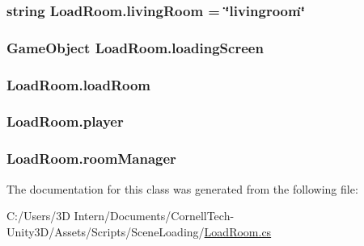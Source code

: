 \subsubsection[{\texorpdfstring{living\+Room}{livingRoom}}]{\setlength{\rightskip}{0pt plus 5cm}string Load\+Room.\+living\+Room = \char`\"{}livingroom\char`\"{}}\hypertarget{class_load_room_abcb915de7cd7a198c227c0fb6fd14abb}{}\label{class_load_room_abcb915de7cd7a198c227c0fb6fd14abb}
\subsubsection[{\texorpdfstring{loading\+Screen}{loadingScreen}}]{\setlength{\rightskip}{0pt plus 5cm}Game\+Object Load\+Room.\+loading\+Screen}\hypertarget{class_load_room_a308e03f01638759404f53480035a56ef}{}\label{class_load_room_a308e03f01638759404f53480035a56ef}
\subsubsection[{\texorpdfstring{load\+Room}{loadRoom}}]{ Load\+Room.\+load\+Room}\hypertarget{class_load_room_ac2bc4bbe4711024d88ea84aefa93360f}{}\label{class_load_room_ac2bc4bbe4711024d88ea84aefa93360f}
\subsubsection[{\texorpdfstring{player}{player}}]{ Load\+Room.\+player}\hypertarget{class_load_room_ad89f4048cd330067fe3bd7463db5a61a}{}\label{class_load_room_ad89f4048cd330067fe3bd7463db5a61a}
\subsubsection[{\texorpdfstring{room\+Manager}{roomManager}}]{ Load\+Room.\+room\+Manager}\hypertarget{class_load_room_a5c7958b95901648e910d75dbda560d52}{}\label{class_load_room_a5c7958b95901648e910d75dbda560d52}


The documentation for this class was generated from the following file\+:\begin{DoxyCompactItemize}
\item 
C\+:/\+Users/3\+D Intern/\+Documents/\+Cornell\+Tech-\/\+Unity3\+D/\+Assets/\+Scripts/\+Scene\+Loading/\hyperlink{_load_room_8cs}{Load\+Room.\+cs}\end{DoxyCompactItemize}
